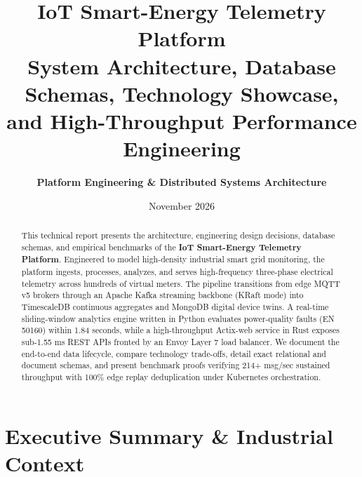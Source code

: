 \documentclass[11pt,a4paper]{article}
\title{
    \vspace{-1.2cm}
    \textbf{\Large IoT Smart-Energy Telemetry Platform}\\
    \large System Architecture, Database Schemas, Technology Showcase, and High-Throughput Performance Engineering
}
\author{
    \textbf{Platform Engineering \& Distributed Systems Architecture}
}
\date{November 2026}
\begin{document}
\maketitle
\thispagestyle{plain}

\begin{abstract}
\noindent This technical report presents the architecture, engineering design decisions, database schemas, and empirical benchmarks of the \textbf{IoT Smart-Energy Telemetry Platform}. Engineered to model high-density industrial smart grid monitoring, the platform ingests, processes, analyzes, and serves high-frequency three-phase electrical telemetry across hundreds of virtual meters. The pipeline transitions from edge MQTT v5 brokers through an Apache Kafka streaming backbone (KRaft mode) into TimescaleDB continuous aggregates and MongoDB digital device twins. A real-time sliding-window analytics engine written in Python evaluates power-quality faults (EN 50160) within 1.84 seconds, while a high-throughput Actix-web service in Rust exposes sub-1.55 ms REST APIs fronted by an Envoy Layer 7 load balancer. We document the end-to-end data lifecycle, compare technology trade-offs, detail exact relational and document schemas, and present benchmark proofs verifying 214+ msg/sec sustained throughput with 100\% edge replay deduplication under Kubernetes orchestration.
\end{abstract}

\vspace{-0.2cm}
{
\hypersetup{linkcolor=carbonink}
\tableofcontents
}
\newpage

\section{Executive Summary \& Industrial Context}
\end{document}
